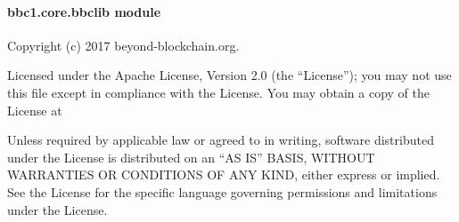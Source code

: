 \documentclass[letterpaper,10pt,english]{sphinxmanual}
\begin{document}
\begin{fulllineitems}
\begin{fulllineitems}
\label{\detokenize{bbc1.core.bbc_stats:bbc1.core.bbc_stats.BBcStats.update_stats}}
\end{fulllineitems}


\begin{fulllineitems}
\label{\detokenize{bbc1.core.bbc_stats:bbc1.core.bbc_stats.BBcStats.update_stats_decrement}}
\end{fulllineitems}


\begin{fulllineitems}
\label{\detokenize{bbc1.core.bbc_stats:bbc1.core.bbc_stats.BBcStats.update_stats_increment}}
\end{fulllineitems}


\end{fulllineitems}



\paragraph{bbc1.core.bbclib module}
\label{\detokenize{bbc1.core.bbclib:module-bbc1.core.bbclib}}\label{\detokenize{bbc1.core.bbclib::doc}}\label{\detokenize{bbc1.core.bbclib:bbc1-core-bbclib-module}}
Copyright (c) 2017 beyond-blockchain.org.

Licensed under the Apache License, Version 2.0 (the “License”);
you may not use this file except in compliance with the License.
You may obtain a copy of the License at
\begin{quote}

\end{quote}

Unless required by applicable law or agreed to in writing, software
distributed under the License is distributed on an “AS IS” BASIS,
WITHOUT WARRANTIES OR CONDITIONS OF ANY KIND, either express or implied.
See the License for the specific language governing permissions and
limitations under the License.
\end{document}
